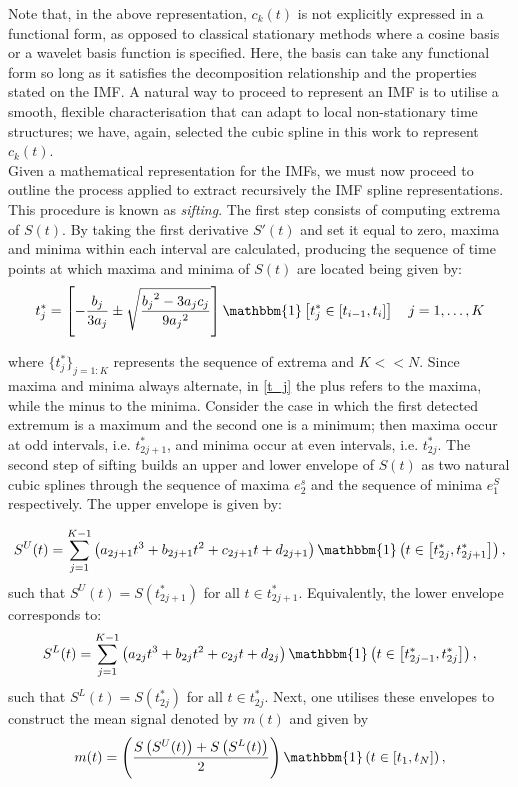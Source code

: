 \noindent Note that, in the above representation, $c_k(t)$ is not explicitly expressed in a functional form, as opposed to classical stationary methods where a cosine basis or a wavelet basis function is specified. Here, the basis can take any functional form so long as it satisfies the decomposition relationship and the properties stated on the IMF. A natural way to proceed to represent an IMF is to utilise a smooth, flexible characterisation that can adapt to local non-stationary time structures; we have, again, selected the cubic spline in this work to represent  $c_k(t)$.\\
\noindent Given a mathematical representation for the IMFs, we must now proceed to outline the process applied to extract recursively the IMF spline representations. This procedure is known as \textit{sifting}. The first step consists of computing extrema of $S(t)$. By taking the first derivative $S'(t)$ and set it equal to zero, maxima and minima within each interval are calculated, producing the sequence of time points at which maxima and minima of $S(t)$ are located being given by:
\begin{equation}
\label{t_j}
t^*_{j} = \left[ - \frac{b_j}{3 a_j} \pm \sqrt{\frac{{b_j}^2 - 3a_j c_j}{9 {a_j}^2}} \right] \mathbbm{1} \left[ t^*_{j} \in \left[ t_{i-1},t_i \right] \right] \quad j= 1, \dots, K
\end{equation}

where $ \{ t_j^{*} \}_{j = 1: K}$ represents the sequence of extrema and $K << N$. Since maxima and minima always alternate, in \ref{t_j} the plus refers to the maxima, while the minus to the minima. Consider the case in which the first detected extremum is a maximum and the second one is a minimum; then maxima occur at odd intervals, i.e. $t^*_{2j+1}$, and minima occur at even intervals, i.e. $t^*_{2j}$. The second step of sifting builds an upper and lower envelope of $S(t)$ as two natural cubic splines through the sequence of maxima $e_2^s$ and the sequence of minima $e_1^S$ respectively. The upper envelope is given by:

\begin{equation}
\label{upper_env}
S^{U}(t) = \sum_{j=1}^{K-1} \left( a_{2j+1}  t^3 + b_{2j+1} t^2 + c_{2j+1} t  +d_{2j+1} \right) \mathbbm{1} \left( t \in \left[ t^*_{2j}, t^*_{2j+1} \right] \right),
\end{equation}
such that $S^U (t) = S(t^*_{2j+1})$ for all $ t \in t^*_{2j+1}$. Equivalently, the lower envelope corresponds to: 
\begin{equation}
\label{lower_env}
S^{L}(t) = \sum_{j=1}^{K-1} \left( a_{2j}  t^3 + b_{2j} t^2 + c_{2j} t  +d_{2j} \right)   \mathbbm{1} \left( t \in \left[ t^*_{2j-1}, t^*_{2j} \right] \right),
\end{equation}
such that $S^L (t) = S(t^*_{2j})$ for all $ t \in t^*_{2j}$. Next, one utilises these envelopes to construct the mean signal denoted by $m(t)$ and given by
\begin{equation}
m(t) = \left( \frac{S \left( S^{U}(t) \right)+S \left( S^{L}(t) \right)}{2} \right) \mathbbm{1} \left( t \in [t_1, t_N] \right),
\end{equation}

